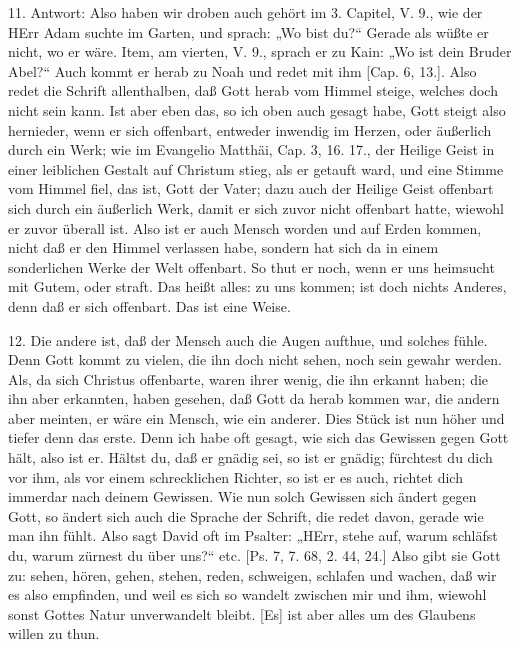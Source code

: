 11. Antwort: Also haben wir droben auch gehört im 3. Capitel, V. 9., wie der HErr Adam suchte im Garten, und sprach: „Wo bist du?“ Gerade als wüßte er nicht, wo er wäre. Item, am vierten, V. 9., sprach er zu Kain: „Wo ist dein Bruder Abel?“ Auch kommt er herab zu Noah und redet mit ihm [Cap. 6, 13.]. Also redet die Schrift allenthalben, daß Gott herab vom Himmel steige, welches doch nicht sein kann. Ist aber eben das, so ich oben auch gesagt habe, Gott steigt also hernieder, wenn er sich offenbart, entweder inwendig im Herzen, oder äußerlich durch ein Werk; wie im Evangelio Matthäi, Cap. 3, 16. 17., der Heilige Geist in einer leiblichen Gestalt auf Christum stieg, als er getauft ward, und eine Stimme vom Himmel fiel, das ist, Gott der Vater; dazu auch der Heilige Geist offenbart sich durch ein äußerlich Werk, damit er sich zuvor nicht offenbart hatte, wiewohl er zuvor überall ist. Also ist er auch Mensch worden und auf Erden kommen, nicht daß er den Himmel verlassen habe, sondern hat sich da in einem sonderlichen Werke der Welt offenbart. So thut er noch, wenn er uns heimsucht mit Gutem, oder straft. Das heißt alles: zu uns kommen; ist doch nichts Anderes, denn daß er sich offenbart. Das ist eine Weise.

12. Die andere ist, daß der Mensch auch die Augen aufthue, und solches fühle. Denn Gott kommt zu vielen, die ihn doch nicht sehen, noch sein gewahr werden. Als, da sich Christus offenbarte, waren ihrer wenig, die ihn erkannt haben; die ihn aber erkannten, haben gesehen, daß Gott da herab kommen war, die andern aber meinten, er wäre ein Mensch, wie ein anderer. Dies Stück ist nun höher und tiefer denn das erste. Denn ich habe oft gesagt, wie sich das Gewissen gegen Gott hält, also ist er. Hältst du, daß er gnädig sei, so ist er gnädig; fürchtest du dich vor ihm, als vor einem schrecklichen Richter, so ist er es auch, richtet dich immerdar nach deinem Gewissen. Wie nun solch Gewissen sich ändert gegen Gott, so ändert sich auch die Sprache der Schrift, die redet davon, gerade wie man ihn fühlt. Also sagt David oft im Psalter: „HErr, stehe auf, warum schläfst du, warum zürnest du über uns?“ etc. [Ps. 7, 7. 68, 2. 44, 24.] Also gibt sie Gott zu: sehen, hören, gehen, stehen, reden, schweigen, schlafen und wachen, daß wir es also empfinden, und weil es sich so wandelt zwischen mir und ihm, wiewohl sonst Gottes Natur unverwandelt bleibt. [Es] ist aber alles um des Glaubens willen zu thun.

